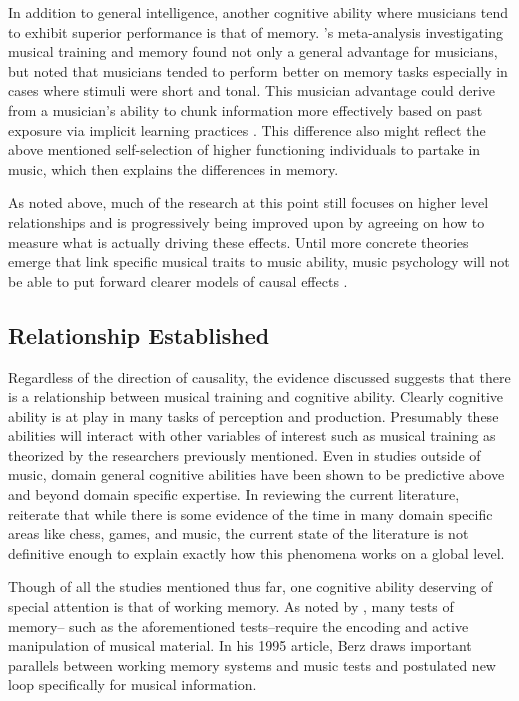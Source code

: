 \documentclass[12pt,]{book}
\begin{document}
In addition to general intelligence, another cognitive ability where musicians tend to exhibit superior performance is that of memory.
\citet{talaminiMusiciansHaveBetter2017}'s meta-analysis investigating musical training and memory found not only a general advantage for musicians, but noted that musicians tended to perform better on memory tasks especially in cases where stimuli were short and tonal.
This musician advantage could derive from a musician's ability to chunk information more effectively based on past exposure via implicit learning practices \citep{ettlingerImplicitMemoryMusic2011, rohrmeierImplicitLearningAcquisition2012}.
This difference also might reflect the above mentioned self-selection of higher functioning individuals to partake in music, which then explains the differences in memory.

As noted above, much of the research at this point still focuses on higher level relationships and is progressively being improved upon by agreeing on how to measure what is actually driving these effects.
Until more concrete theories emerge that link specific musical traits to music ability, music psychology will not be able to put forward clearer models of causal effects \citep{bakerExaminingMusicalSophistication2018a}.

\hypertarget{relationship-established}{%
\subsection{Relationship Established}\label{relationship-established}}

Regardless of the direction of causality, the evidence discussed suggests that there is a relationship between musical training and cognitive ability.
Clearly cognitive ability is at play in many tasks of perception and production.
Presumably these abilities will interact with other variables of interest such as musical training as theorized by the researchers previously mentioned.
Even in studies outside of music, domain general cognitive abilities have been shown to be predictive above and beyond domain specific expertise.
In reviewing the current literature, \citep{hambrickDomainGeneralModelsExpertise2019} reiterate that while there is some evidence of the time in many domain specific areas like chess, games, and music, the current state of the literature is not definitive enough to explain exactly how this phenomena works on a global level.

Though of all the studies mentioned thus far, one cognitive ability deserving of special attention is that of working memory.
As noted by \citep{berzWorkingMemoryMusic1995}, many tests of memory-- such as the aforementioned tests--require the encoding and active manipulation of musical material.
In his 1995 article, Berz draws important parallels between working memory systems and music tests and postulated new loop specifically for musical information.
\end{document}
